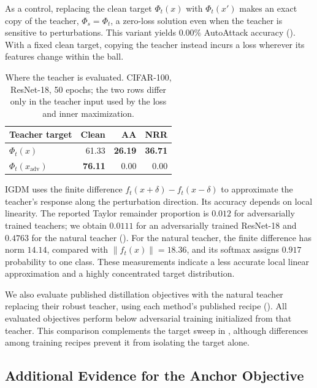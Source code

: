 As a control, replacing the clean target $\Phi_t(x)$ with $\Phi_t(x')$ makes an exact copy of the
teacher, $\Phi_s=\Phi_t$, a zero-loss solution even when the teacher is sensitive to perturbations.
This variant yields $0.00\%$ AutoAttack accuracy (). With a fixed clean target,
copying the teacher instead incurs a loss wherever its features change within the ball.

\begin{table}[!htbp]
  \centering \small \setlength{\tabcolsep}{5pt}
  \caption{Where the teacher is evaluated. CIFAR-100, ResNet-18, 50 epochs; the two rows differ only
  in the teacher input used by the loss and inner maximization.}
  \label{tab:teacherread}
  \begin{tabular}{lrrr}
    \toprule
    Teacher target & Clean & AA & NRR \\
    \midrule
    $\Phi_t(x)$                     & 61.33 & \textbf{26.19} & \textbf{36.71} \\
    $\Phi_t(x_{\mathrm{adv}})$      & \textbf{76.11} & 0.00 & 0.00 \\
    \bottomrule
  \end{tabular}
\end{table}

IGDM \citep{igdm} uses the finite difference $f_t(x+\delta)-f_t(x-\delta)$ to approximate the
teacher's response along the perturbation direction. Its accuracy depends on local linearity.
The reported Taylor remainder proportion is $0.012$ for adversarially trained teachers; we obtain
$0.0111$ for an adversarially trained ResNet-18 and $0.4763$ for the natural teacher
(). For the natural teacher, the finite difference has norm $14.14$, compared
with $\lVert f_t(x)\rVert=18.36$, and its softmax assigns $0.917$ probability to one class.
These measurements indicate a less accurate local linear approximation and a highly concentrated
target distribution.

We also evaluate published distillation objectives with the natural teacher replacing their robust
teacher, using each method's published recipe (). All evaluated objectives
perform below adversarial training initialized from that teacher. This comparison complements the
target sweep in , although differences among training recipes prevent it from
isolating the target alone.

\subsection{Additional Evidence for the Anchor Objective}
\label{app:anchor_measurements}
\label{sec:empirical_geometry}

